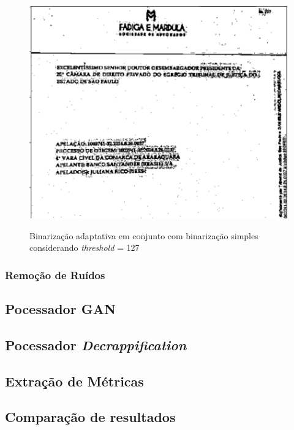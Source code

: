\begin{figure}[H]
  \centering
  \caption{Binarização adaptativa  em conjunto com binarização simples considerando \textit{threshold} = 127}
  \includegraphics[scale=.7]{figuras/binarizacao-adaptativa.png}
  \label{fig:binarizacao-adaptativa}
\end{figure}

\subsubsection{Remoção de Ruídos}

\subsection{Pocessador GAN} \label{ssec:processor-gan}
\subsection{Pocessador \textit{Decrappification}}
\subsection{Extração de Métricas}
\subsection{Comparação de resultados}